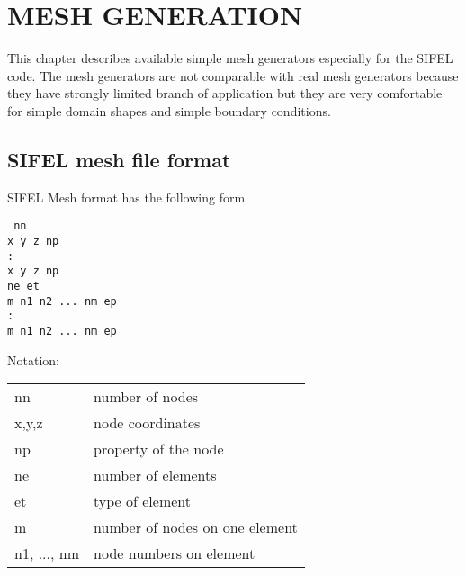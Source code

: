 \documentclass[12pt]{book}
\begin{document}
\tableofcontents
\chapter{MESH GENERATION}

This chapter describes available simple mesh generators especially for the SIFEL code.
The mesh generators are not comparable with real mesh generators because they have
strongly limited branch of application but they are very comfortable for simple domain shapes
and simple boundary conditions.

\section{SIFEL mesh file format}

SIFEL Mesh format has the following form

\noindent
{\tt
nn\\
x y z np\\
:\\
x y z np\\
ne et\\
m n1 n2 ... nm ep\\
:\\
m n1 n2 ... nm ep\\
}

\noindent
Notation:

\noindent
\begin{tabular}{ll}
nn & number of nodes
\\
x,y,z & node coordinates
\\
np & property of the node
\\
ne & number of elements
\\
et & type of element
\\
m & number of nodes on one element
\\
n1, ..., nm & node numbers on element
\end{tabular}
\end{document}
